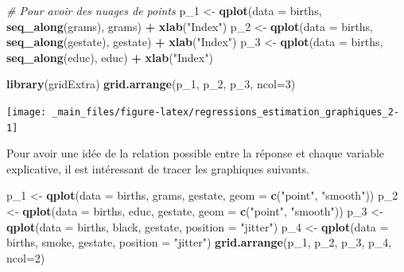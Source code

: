 \documentclass[
  11pt,
]{book}
\newenvironment{Shaded}{\begin{snugshade}}{\end{snugshade}}
\newcommand{\CommentTok}[1]{\textcolor[rgb]{0.56,0.35,0.01}{\textit{#1}}}
\newcommand{\DataTypeTok}[1]{\textcolor[rgb]{0.13,0.29,0.53}{#1}}
\newcommand{\DecValTok}[1]{\textcolor[rgb]{0.00,0.00,0.81}{#1}}
\newcommand{\KeywordTok}[1]{\textcolor[rgb]{0.13,0.29,0.53}{\textbf{#1}}}
\newcommand{\NormalTok}[1]{#1}
\newcommand{\OperatorTok}[1]{\textcolor[rgb]{0.81,0.36,0.00}{\textbf{#1}}}
\newcommand{\StringTok}[1]{\textcolor[rgb]{0.31,0.60,0.02}{#1}}
\numberwithin{equation}{section}
\numberwithin{countremarque}{section}
\begin{document}
\begin{Shaded}
\begin{Highlighting}[]
\CommentTok{\# Pour avoir des nuages de points}
\NormalTok{p\_}\DecValTok{1}\NormalTok{ \textless{}{-}}\StringTok{ }\KeywordTok{qplot}\NormalTok{(}\DataTypeTok{data =}\NormalTok{ births, }\KeywordTok{seq\_along}\NormalTok{(grams), grams) }\OperatorTok{+}\StringTok{ }\KeywordTok{xlab}\NormalTok{(}\StringTok{"Index"}\NormalTok{)}
\NormalTok{p\_}\DecValTok{2}\NormalTok{ \textless{}{-}}\StringTok{ }\KeywordTok{qplot}\NormalTok{(}\DataTypeTok{data =}\NormalTok{ births, }\KeywordTok{seq\_along}\NormalTok{(gestate), gestate) }\OperatorTok{+}\StringTok{ }\KeywordTok{xlab}\NormalTok{(}\StringTok{"Index"}\NormalTok{)}
\NormalTok{p\_}\DecValTok{3}\NormalTok{ \textless{}{-}}\StringTok{ }\KeywordTok{qplot}\NormalTok{(}\DataTypeTok{data =}\NormalTok{ births, }\KeywordTok{seq\_along}\NormalTok{(educ), educ) }\OperatorTok{+}\StringTok{ }\KeywordTok{xlab}\NormalTok{(}\StringTok{"Index"}\NormalTok{)}

\KeywordTok{library}\NormalTok{(gridExtra)}
\KeywordTok{grid.arrange}\NormalTok{(p\_}\DecValTok{1}\NormalTok{, p\_}\DecValTok{2}\NormalTok{, p\_}\DecValTok{3}\NormalTok{, }\DataTypeTok{ncol=}\DecValTok{3}\NormalTok{)}
\end{Highlighting}
\end{Shaded}

\begin{center}\texttt{[image: \_main\_files/figure-latex/regressions\_estimation\_graphiques\_2-1]} \end{center}

Pour avoir une idée de la relation possible entre la réponse et chaque variable explicative, il est intéressant de tracer les graphiques suivants.

\begin{Shaded}
\begin{Highlighting}[]
\NormalTok{p\_}\DecValTok{1}\NormalTok{ \textless{}{-}}\StringTok{ }\KeywordTok{qplot}\NormalTok{(}\DataTypeTok{data =}\NormalTok{ births, grams, gestate,}
             \DataTypeTok{geom =} \KeywordTok{c}\NormalTok{(}\StringTok{"point"}\NormalTok{, }\StringTok{"smooth"}\NormalTok{))}
\NormalTok{p\_}\DecValTok{2}\NormalTok{ \textless{}{-}}\StringTok{ }\KeywordTok{qplot}\NormalTok{(}\DataTypeTok{data =}\NormalTok{ births, educ, gestate, }
             \DataTypeTok{geom =} \KeywordTok{c}\NormalTok{(}\StringTok{"point"}\NormalTok{, }\StringTok{"smooth"}\NormalTok{))}
\NormalTok{p\_}\DecValTok{3}\NormalTok{ \textless{}{-}}\StringTok{ }\KeywordTok{qplot}\NormalTok{(}\DataTypeTok{data =}\NormalTok{ births, black, gestate, }\DataTypeTok{position =} \StringTok{"jitter"}\NormalTok{)}
\NormalTok{p\_}\DecValTok{4}\NormalTok{ \textless{}{-}}\StringTok{ }\KeywordTok{qplot}\NormalTok{(}\DataTypeTok{data =}\NormalTok{ births, smoke, gestate, }\DataTypeTok{position =} \StringTok{"jitter"}\NormalTok{)}
\KeywordTok{grid.arrange}\NormalTok{(p\_}\DecValTok{1}\NormalTok{, p\_}\DecValTok{2}\NormalTok{, p\_}\DecValTok{3}\NormalTok{, p\_}\DecValTok{4}\NormalTok{, }\DataTypeTok{ncol=}\DecValTok{2}\NormalTok{)}
\end{Highlighting}
\end{Shaded}
\end{document}
